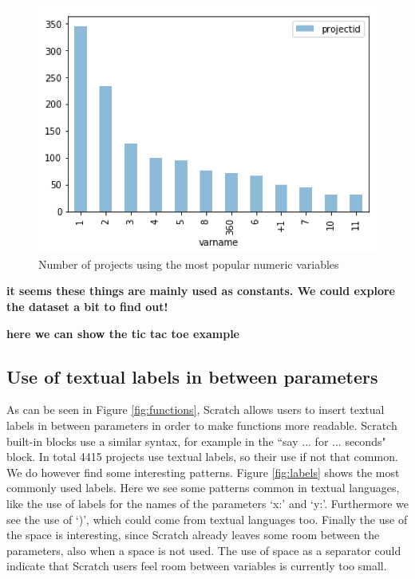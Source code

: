 \documentclass[conference]{IEEEtran}
\newcommand{\todo}[1]{ \textbf{#1} }
\begin{document}
\begin{figure}
	\begin{center}
		\includegraphics[width=\columnwidth]{fig/numeric}
		\caption{Number of projects using the most popular numeric variables}
		\label{fig:numeric}
	\end{center}
\end{figure} 

\todo{it seems these things are mainly used as constants. We could explore the dataset a bit to find out!}

\todo{here we can show the tic tac toe example}

\subsection{Use of textual labels in between parameters}

As can be seen in Figure \ref{fig:functions}, Scratch allows users to insert textual labels in between parameters in order to make functions more readable. Scratch built-in blocks use a similar syntax, for example in the ``say ... for ... seconds" block. In total 4415 projects use textual labels, so their use if not that common. We do however find some interesting patterns. Figure \ref{fig:labels} shows the most commonly used labels. Here we see some patterns common in textual languages, like the use of labels for the names of the parameters `x:' and `y:'. Furthermore we see the use of `)', which could come from textual languages too. Finally the use of the space is interesting, since Scratch already leaves some room between the parameters, also when a space is not used. The use of space as a separator could indicate that Scratch users feel room between variables is currently too small.
\end{document}
